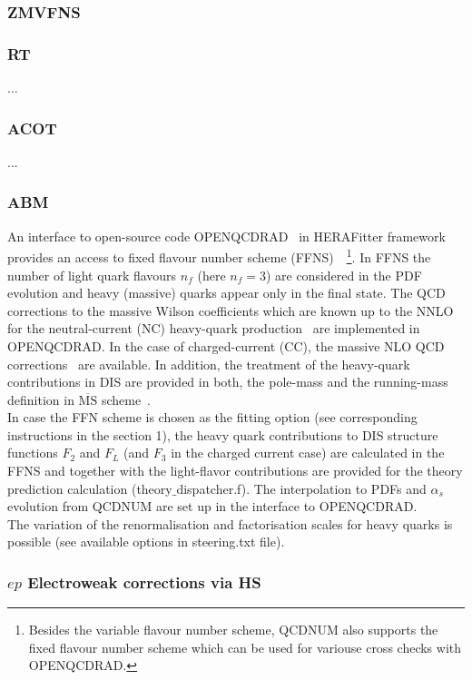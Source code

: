 \documentclass[11pt,a4paper]{article}
\begin{document}
\subsubsection{ZMVFNS}
\subsubsection{RT}
... 
\subsubsection{ACOT}
...
\subsubsection{ABM}
An interface to open-source code OPENQCDRAD~\cite{openqcdrad:page} in HERAFitter framework 
provides an access to 
fixed flavour number scheme (FFNS)~\cite{Laenen:1992,Laenen:1993,Riem:1995}~\footnote{Besides 
the variable flavour number 
scheme, QCDNUM also supports the fixed flavour number scheme which can be used for variouse 
cross checks with OPENQCDRAD.}. In FFNS the number of light quark 
flavours $n_{f}$ (here $n_{f}=3$) are considered in the PDF evolution and heavy (massive) 
quarks appear only in the final state. 
The QCD corrections to the massive Wilson coefficients which are known up to the NNLO
for the neutral-current (NC) heavy-quark production~\cite{} are implemented in OPENQCDRAD.
In the case of charged-current (CC), the massive NLO QCD corrections~\cite{} are available.
In addition, the treatment of the heavy-quark contributions in DIS are provided 
in both, the pole-mass and the running-mass definition in $\overline{\text{MS}}$ 
scheme~\cite{Alekhin:runm}. \\
In case the FFN scheme is chosen as the fitting option (see corresponding instructions in the section 1),
the heavy quark contributions to DIS structure functions $F_2$ and $F_L$ (and $F_3$ in the charged 
current case) are calculated in the FFNS and together with the light-flavor contributions are 
provided for the theory prediction calculation (theory$\_$dispatcher.f).
The interpolation to PDFs and $\alpha_s$ evolution from QCDNUM are set up in the interface to OPENQCDRAD. \\
The variation of the renormalisation and factorisation scales for heavy quarks is 
possible (see available options in steering.txt file).
%
%       
\subsubsection{$ep$ Electroweak corrections via HS}
\end{document}
